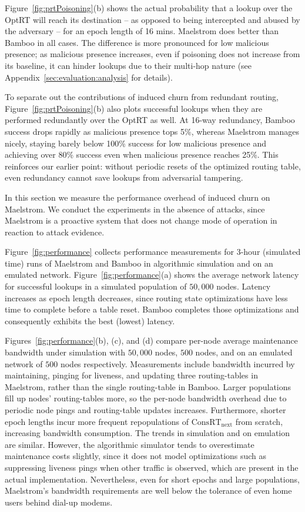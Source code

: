 \documentclass[10pt,twocolumn]{article}
\newcommand{\PRT}{OptRT\xspace}
\newcommand{\CRT}{ConsRT\xspace}
\newcommand{\CRTNext}{$\mathrm{\CRT}_{\mbox{next}}$\xspace}
\begin{document}
Figure~\ref{fig:prtPoisoning}(b) shows the
actual probability that a lookup over the \PRT will reach its
destination -- as opposed to being intercepted and abused by the
adversary -- for an epoch length of 16 mins. 
Maelstrom does better than Bamboo in all cases. The difference is more pronounced for
low malicious presence; as malicious presence increases, even if
poisoning does not increase from its baseline, it can hinder lookups due
to their multi-hop nature (see Appendix~\ref{sec:evaluation:analysis} for details).

To separate out the contributions of induced churn from redundant
routing, Figure~\ref{fig:prtPoisoning}(b) also plots successful lookups
when they are performed redundantly over the \PRT as well.  At 16-way
redundancy, Bamboo success drops rapidly as malicious presence tops 5\%, whereas
Maelstrom manages nicely, staying barely below 100\% success for low
malicious presence and achieving over 80\% success even when
malicious presence reaches 25\%.  This reinforces our earlier point:
without periodic resets of the optimized routing table, even
redundancy cannot
save lookups from adversarial tampering.

In this section we measure the performance overhead of induced churn on
Maelstrom. We conduct the experiments in the absence of attacks, since
Maelstrom is a proactive system that does not change mode of operation
in reaction to attack evidence.

Figure~\ref{fig:performance} collects performance measurements for
3-hour (simulated time) runs of Maelstrom and Bamboo in algorithmic simulation and on an
emulated network.  Figure~\ref{fig:performance}(a) shows the average network 
latency for successful lookups in a simulated population of $50,000$
nodes.  Latency increases as epoch length decreases, since routing state
optimizations have less time to complete before a table reset.  Bamboo
completes those optimizations and consequently exhibits the best (lowest) latency. 

Figures~\ref{fig:performance}(b), (c), and (d) compare per-node average maintenance
bandwidth under simulation with $50,000$ nodes, $500$ nodes, and on
an emulated network of $500$ nodes respectively.  Measurements include
bandwidth incurred by maintaining, pinging for liveness, and updating
three routing-tables in Maelstrom, rather than the single routing-table
in Bamboo.  Larger
populations fill up nodes' routing-tables more, so the per-node
bandwidth overhead due to periodic node pings and routing-table updates
increases.  Furthermore, shorter epoch lengths incur more frequent
repopulations of \CRTNext from scratch, increasing bandwidth
consumption. The trends in simulation and on emulation are
similar. However, the algorithmic
simulator tends to overestimate maintenance costs slightly, since it does not
model optimizations such as suppressing liveness pings when other
traffic is observed, which are present in the actual implementation.
Nevertheless, even for short epochs and large populations, Maelstrom's bandwidth
requirements are well below the tolerance of even home users behind
dial-up modems.
\end{document}
